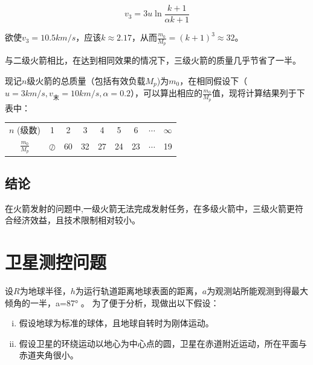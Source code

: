\documentclass[UTF8]{ctexart}
\begin{document}
        \begin{equation*}
            v_{3}=3 u \ln \frac{k+1}{\alpha k+1}
        \end{equation*}
        \par 欲使$v_3 = 10.5 km/s$，应该$k\approx 2.17$，从而$\frac{m_0}{M_p}=(k+1)^3\approx 32$。
        \par 与二级火箭相比，在达到相同效果的情况下，三级火箭的质量几乎节省了一半。
        \par 现记$n$级火箭的总质量（包括有效负载$M_p$)为$m_0$，在相同假设下（$u = 3 km/s,v_末= 10km/s,\alpha= 0.2$），可以算出相应的$\frac{m_0}{M_p}$值，现将计算结果列于下表中：
        \begin{center}
            \begin{tabular}{ccccccccc}
                \toprule
                    $n$ (级数)&1 & 2 &  3 & 4 &   5 & 6 & $\cdots$ & $\infty$ \\
                    $\frac{m_0}{M_p}$& $\oslash $& 60 & 32 & 27&  24 & 23& $\cdots$ & 19 \\
                \bottomrule
            \end{tabular}
            \end{center}
       
    \subsection{结论}
    在火箭发射的问题中,一级火箭无法完成发射任务，在多级火箭中，三级火箭更符合经济效益，且技术限制相对较小。
    \newpage

    \section{卫星测控问题}
    \setcounter{equation}{0}
        设$R$为地球半径，$h$为运行轨道距离地球表面的距离，$a$为观测站所能观测到得最大倾角的一半，a=87° 。
        为了便于分析，现做出以下假设：
        \begin{enumerate}[(i)]
            \item 假设地球为标准的球体，且地球自转时为刚体运动。
            \item 假设卫星的环绕运动以地心为中心点的圆，卫星在赤道附近运动，所在平面与赤道夹角很小。
        \end{enumerate}
\end{document}

